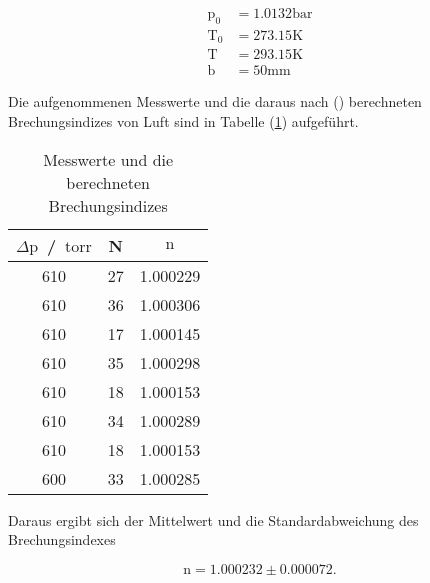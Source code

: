 \begin{align*}
\text{p}_0 &= 1.0132 \si{\bar}\\
\text{T}_0 &= 273.15 \si{\kelvin}\\
\text{T} &= 293.15 \si{\kelvin}\\
\text{b} &= 50 \si{\milli\meter}
\end{align*}

\noindent
Die aufgenommenen Messwerte und die daraus nach () berechneten Brechungsindizes von Luft sind in Tabelle (\ref{tab:n}) aufgeführt.

\newpage
\begin{table}
  \centering
  \caption{Messwerte und die berechneten Brechungsindizes}
  \label{tab:n}
  \begin{tabular}{c c c}
  \toprule
  $ \Delta \text{p}$ \,/\, $\text{torr} $ & N & $\text{n}$\\
  \midrule 
 
    610 & 27 & 1.000229 \\
    610 & 36 & 1.000306 \\
    610 & 17 & 1.000145 \\
    610 & 35 & 1.000298 \\
    610 & 18 & 1.000153 \\
    610 & 34 & 1.000289 \\
    610 & 18 & 1.000153 \\
    600 & 33 & 1.000285 \\

  \bottomrule
  \end{tabular}
\end{table}

\noindent
Daraus ergibt sich der Mittelwert und die Standardabweichung des Brechungsindexes

\begin{equation*}
\text{n} = 1.000232 \pm 0.000072.
\end{equation*}

